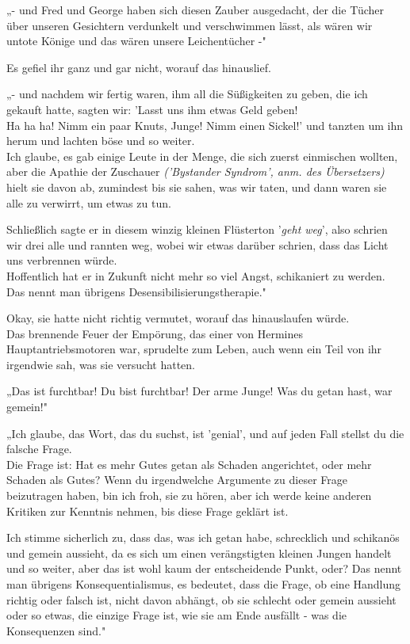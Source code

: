 {„- und Fred und George haben sich diesen Zauber ausgedacht, der die Tücher über unseren Gesichtern verdunkelt und verschwimmen lässt, als wären wir untote Könige und das wären unsere Leichentücher -"

Es gefiel ihr ganz und gar nicht, worauf das hinauslief.

„- und nachdem wir fertig waren, ihm all die Süßigkeiten zu geben, die ich gekauft hatte, sagten wir: 'Lasst uns ihm etwas Geld geben!\\ Ha ha ha! Nimm ein paar Knuts, Junge! Nimm einen Sickel!' und tanzten um ihn herum und lachten böse und so weiter.\\ Ich glaube, es gab einige Leute in der Menge, die sich zuerst einmischen wollten, aber die Apathie der Zuschauer \emph{('Bystander Syndrom', anm. des Übersetzers)} hielt sie davon ab, zumindest bis sie sahen, was wir taten, und dann waren sie alle zu verwirrt, um etwas zu tun.

Schließlich sagte er in diesem winzig kleinen Flüsterton '\emph{geht weg}', also schrien wir drei alle und rannten weg, wobei wir etwas darüber schrien, dass das Licht uns verbrennen würde.\\ Hoffentlich hat er in Zukunft nicht mehr so viel Angst, schikaniert zu werden. Das nennt man übrigens Desensibilisierungstherapie."

Okay, sie hatte nicht richtig vermutet, worauf das hinauslaufen würde.\\ Das brennende Feuer der Empörung, das einer von Hermines Hauptantriebsmotoren war, sprudelte zum Leben, auch wenn ein Teil von ihr irgendwie sah, was sie versucht hatten.

„Das ist furchtbar! Du bist furchtbar! Der arme Junge! Was du getan hast, war gemein!"

„Ich glaube, das Wort, das du suchst, ist 'genial', und auf jeden Fall stellst du die falsche Frage.\\ Die Frage ist: Hat es mehr Gutes getan als Schaden angerichtet, oder mehr Schaden als Gutes? Wenn du irgendwelche Argumente zu dieser Frage beizutragen haben, bin ich froh, sie zu hören, aber ich werde keine anderen Kritiken zur Kenntnis nehmen, bis diese Frage geklärt ist.

Ich stimme sicherlich zu, dass das, was ich getan habe, schrecklich und schikanös und gemein aussieht, da es sich um einen verängstigten kleinen Jungen handelt und so weiter, aber das ist wohl kaum der entscheidende Punkt, oder? Das nennt man übrigens Konsequentialismus, es bedeutet, dass die Frage, ob eine Handlung richtig oder falsch ist, nicht davon abhängt, ob sie schlecht oder gemein aussieht oder so etwas, die einzige Frage ist, wie sie am Ende ausfällt - was die Konsequenzen sind."

}
